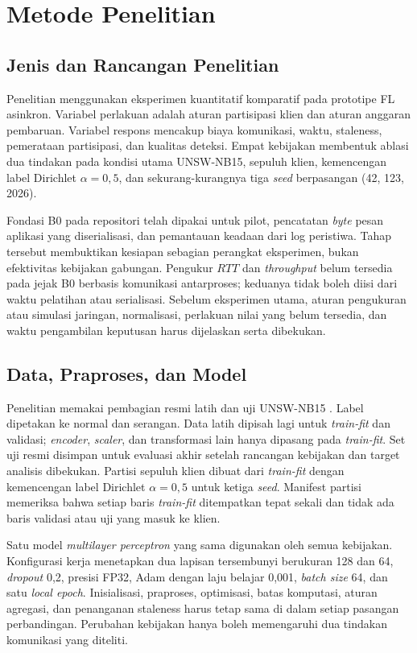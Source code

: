 \chapter{Metode Penelitian}
\label{bab:metode}

\section{Jenis dan Rancangan Penelitian}
Penelitian menggunakan eksperimen kuantitatif komparatif pada prototipe FL asinkron. Variabel perlakuan adalah aturan partisipasi klien dan aturan anggaran pembaruan. Variabel respons mencakup biaya komunikasi, waktu, staleness, pemerataan partisipasi, dan kualitas deteksi. Empat kebijakan membentuk ablasi dua tindakan pada kondisi utama UNSW-NB15, sepuluh klien, kemencengan label Dirichlet $\alpha=0{,}5$, dan sekurang-kurangnya tiga \textit{seed} berpasangan (42, 123, 2026).

Fondasi B0 pada repositori telah dipakai untuk pilot, pencatatan \textit{byte} pesan aplikasi yang diserialisasi, dan pemantauan keadaan dari log peristiwa. Tahap tersebut membuktikan kesiapan sebagian perangkat eksperimen, bukan efektivitas kebijakan gabungan. Pengukur $RTT$ dan \textit{throughput} belum tersedia pada jejak B0 berbasis komunikasi antarproses; keduanya tidak boleh diisi dari waktu pelatihan atau serialisasi. Sebelum eksperimen utama, aturan pengukuran atau simulasi jaringan, normalisasi, perlakuan nilai yang belum tersedia, dan waktu pengambilan keputusan harus dijelaskan serta dibekukan.

\section{Data, Praproses, dan Model}
Penelitian memakai pembagian resmi latih dan uji UNSW-NB15 \cite{unswdata}. Label dipetakan ke normal dan serangan. Data latih dipisah lagi untuk \textit{train-fit} dan validasi; \textit{encoder}, \textit{scaler}, dan transformasi lain hanya dipasang pada \textit{train-fit}. Set uji resmi disimpan untuk evaluasi akhir setelah rancangan kebijakan dan target analisis dibekukan. Partisi sepuluh klien dibuat dari \textit{train-fit} dengan kemencengan label Dirichlet $\alpha=0{,}5$ untuk ketiga \textit{seed}. Manifest partisi memeriksa bahwa setiap baris \textit{train-fit} ditempatkan tepat sekali dan tidak ada baris validasi atau uji yang masuk ke klien.

Satu model \textit{multilayer perceptron} yang sama digunakan oleh semua kebijakan. Konfigurasi kerja menetapkan dua lapisan tersembunyi berukuran 128 dan 64, \textit{dropout} 0,2, presisi FP32, Adam dengan laju belajar 0,001, \textit{batch size} 64, dan satu \textit{local epoch}. Inisialisasi, praproses, optimisasi, batas komputasi, aturan agregasi, dan penanganan staleness harus tetap sama di dalam setiap pasangan perbandingan. Perubahan kebijakan hanya boleh memengaruhi dua tindakan komunikasi yang diteliti.

